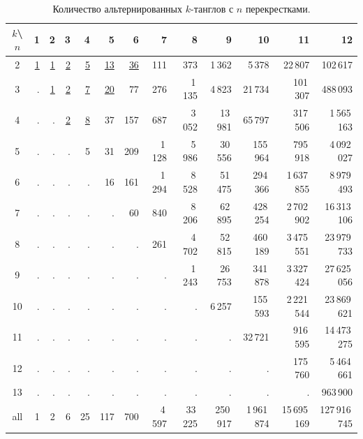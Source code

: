 \documentclass[12pt]{article}
\theoremstyle{plain}
\theoremstyle{definition}
\begin{document}
		\begin{table}[ht]
			\caption{Количество альтернированных $k$-танглов с $n$ перекрестками.\label{table:alternating-tangles-table}}
			\centering
			{\footnotesize
			\let\ul=\underline
			\begin{tabular}{|c||r|r|r|r|r|r|r|r|r|r|r|r|}
			\hline
			$k$\textbackslash $n$
			    &      1 &      2 &      3 &      4 &       5 &       6 &      7 &       8 &        9 &          10 &           11 &            12 \\
			\hline\hline
			2   & \ul{1} & \ul{1} & \ul{2} & \ul{5} & \ul{13} & \ul{36} &    111 &     373 &   1\,362 &      5\,378 &      22\,807 &      102\,617 \\
			3   &      . & \ul{1} & \ul{2} & \ul{7} & \ul{20} &      77 &    276 &  1\,135 &   4\,823 &     21\,734 &     101\,307 &      488\,093 \\
			4   &      . &      . & \ul{2} & \ul{8} &      37 &     157 &    687 &  3\,052 &  13\,981 &     65\,797 &     317\,506 &   1\,565\,163 \\
			5   &      . &      . &      . &      5 &      31 &     209 & 1\,128 &  5\,986 &  30\,556 &    155\,964 &     795\,918 &   4\,092\,027 \\
			6   &      . &      . &      . &      . &      16 &     161 & 1\,294 &  8\,528 &  51\,475 &    294\,366 &  1\,637\,855 &   8\,979\,493 \\
			7   &      . &      . &      . &      . &       . &      60 &    840 &  8\,206 &  62\,895 &    428\,254 &  2\,702\,902 &  16\,313\,106 \\
			8   &      . &      . &      . &      . &       . &       . &    261 &  4\,702 &  52\,815 &    460\,189 &  3\,475\,551 &  23\,979\,733 \\
			9   &      . &      . &      . &      . &       . &       . &      . &  1\,243 &  26\,753 &    341\,878 &  3\,327\,424 &  27\,625\,056 \\
			10  &      . &      . &      . &      . &       . &       . &      . &       . &   6\,257 &    155\,593 &  2\,221\,544 &  23\,869\,621 \\
			11  &      . &      . &      . &      . &       . &       . &      . &       . &        . &     32\,721 &     916\,595 &  14\,473\,275 \\
			12  &      . &      . &      . &      . &       . &       . &      . &       . &        . &           . &     175\,760 &   5\,464\,661 \\
			13  &      . &      . &      . &      . &       . &       . &      . &       . &        . &           . &            . &      963\,900 \\
			\hline
			all &      1 &      2 &      6 &     25 &     117 &     700 & 4\,597 & 33\,225 & 250\,917 & 1\,961\,874 & 15\,695\,169 & 127\,916\,745 \\
			\hline
			\end{tabular}
			}
		\end{table}
\end{document}
